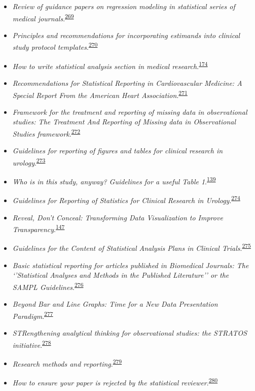 \documentclass[
  a4paper,
]{book}
\begin{document}
\begin{itemize}
\item
  \emph{Review of guidance papers on regression modeling in statistical series of medical journals}.\textsuperscript{\protect\hyperlink{ref-Wallisch2022}{269}}
\item
  \emph{Principles and recommendations for incorporating estimands into clinical study protocol templates}.\textsuperscript{\protect\hyperlink{ref-Lynggaard2022}{270}}
\item
  \emph{How to write statistical analysis section in medical research}.\textsuperscript{\protect\hyperlink{ref-Dwivedi2022}{174}}
\item
  \emph{Recommendations for Statistical Reporting in Cardiovascular Medicine: A Special Report From the American Heart Association}.\textsuperscript{\protect\hyperlink{ref-Althouse2021}{271}}
\item
  \emph{Framework for the treatment and reporting of missing data in observational studies: The Treatment And Reporting of Missing data in Observational Studies framework}.\textsuperscript{\protect\hyperlink{ref-Lee2021}{272}}
\item
  \emph{Guidelines for reporting of figures and tables for clinical research in urology}.\textsuperscript{\protect\hyperlink{ref-Vickers2020}{273}}
\item
  \emph{Who is in this study, anyway? Guidelines for a useful Table 1}.\textsuperscript{\protect\hyperlink{ref-Hayes-Larson2019}{139}}
\item
  \emph{Guidelines for Reporting of Statistics for Clinical Research in Urology}.\textsuperscript{\protect\hyperlink{ref-assel2019}{274}}
\item
  \emph{Reveal, Don't Conceal: Transforming Data Visualization to Improve Transparency}.\textsuperscript{\protect\hyperlink{ref-Weissgerber2019}{147}}
\item
  \emph{Guidelines for the Content of Statistical Analysis Plans in Clinical Trials}.\textsuperscript{\protect\hyperlink{ref-Gamble2017}{275}}
\item
  \emph{Basic statistical reporting for articles published in Biomedical Journals: The `'Statistical Analyses and Methods in the Published Literature'' or the SAMPL Guidelines}.\textsuperscript{\protect\hyperlink{ref-Lang2015}{276}}
\item
  \emph{Beyond Bar and Line Graphs: Time for a New Data Presentation Paradigm}.\textsuperscript{\protect\hyperlink{ref-Weissgerber2015}{277}}
\item
  \emph{STRengthening analytical thinking for observational studies: the STRATOS initiative}.\textsuperscript{\protect\hyperlink{ref-Sauerbrei2014}{278}}
\item
  \emph{Research methods and reporting}.\textsuperscript{\protect\hyperlink{ref-groves2008}{279}}
\item
  \emph{How to ensure your paper is rejected by the statistical reviewer}.\textsuperscript{\protect\hyperlink{ref-stratton2005}{280}}
\end{itemize}
\end{document}
